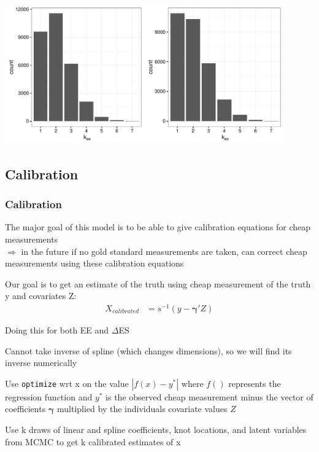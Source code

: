 \documentclass[handout]{beamer}\usepackage[]{graphicx}\usepackage[]{color}
\begin{document}
\begin{frame}
  \includegraphics[width=12cm,height=6cm]{khist.pdf}


\end{frame}


\subsection{Calibration}


\begin{frame}
\frametitle{Calibration}
The major goal of this model is to be able to give calibration equations for cheap measurements \\

$\Rightarrow$ in the future if no gold standard measurements are taken, can correct cheap measurements using these calibration equations \\

\vspace{0.2cm}

Our goal is to get an estimate of the truth using cheap measurement of the truth y and covariates Z:
\begin{align*}
  X_{calibrated} &= s^{-1}(y-\boldsymbol{\gamma}' Z) 
\end{align*}

\vspace{0.2cm}
Doing this for both EE and $\Delta$ES

\end{frame}


\begin{frame}
Cannot take inverse of spline (which changes dimensions), so we will find its inverse numerically

\vspace{0.3cm}

Use \texttt{optimize} wrt x on the value $|f(x)-y^*|$ where $f()$ represents the regression function and $y^*$ is the observed cheap measurement minus the vector of coefficients $\boldsymbol{\gamma}$ multiplied by the individuals covariate values $Z$

\vspace{0.3cm}

Use k draws of linear and spline coefficients, knot locations, and latent variables from MCMC to get k calibrated estimates of x


\end{frame}
\end{document}

